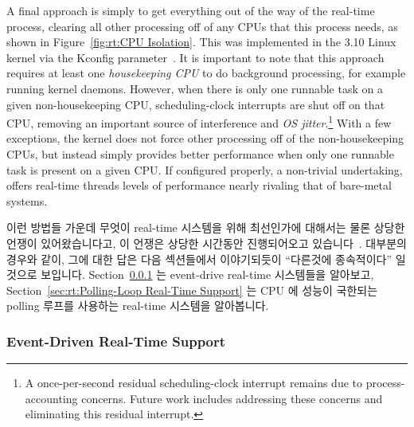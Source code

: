 A final approach is simply to get everything out of the way of the
real-time process, clearing all other processing off of any CPUs that
this process needs, as shown in Figure~\ref{fig:rt:CPU Isolation}.
This was implemented in the 3.10 Linux kernel via the 
Kconfig parameter~\cite{FredericWeisbecker2013nohz}.
It is important to note that this approach requires at least one
\emph{housekeeping CPU} to do background processing, for example running
kernel daemons.
However, when there is only one runnable task on a given non-housekeeping CPU,
scheduling-clock interrupts are shut off on that CPU, removing an important
source of interference and \emph{OS jitter}.\footnote{
	A once-per-second residual scheduling-clock interrupt remains
	due to process-accounting concerns.
	Future work includes addressing these concerns and eliminating
	this residual interrupt.}
With a few exceptions, the kernel does not force other processing off of the
non-housekeeping CPUs, but instead simply provides better performance
when only one runnable task is present on a given CPU.
If configured properly, a non-trivial undertaking, 
offers real-time threads levels of performance nearly rivaling that of
bare-metal systems.
\fi

이런 방법들 가운데 무엇이 real-time 시스템을 위해 최선인가에 대해서는 물론
상당한 언쟁이 있어왔습니다고, 이 언쟁은 상당한 시간동안 진행되어오고
있습니다~\cite{JonCorbet2004RealTimeLinuxPart1,JonCorbet2004RealTimeLinuxPart2}.
대부분의 경우와 같이, 그에 대한 답은 다음 섹션들에서 이야기되듯이 ``다른것에
종속적이다'' 일 것으로 보입니다.
Section~\ref{sec:rt:Event-Driven Real-Time Support} 는 event-drive real-time
시스템들을 알아보고,
Section~\ref{sec:rt:Polling-Loop Real-Time Support} 는 CPU 에 성능이 국한되는
polling 루프를 사용하는 real-time 시스템을 알아봅니다.

\subsubsection{Event-Driven Real-Time Support}
\label{sec:rt:Event-Driven Real-Time Support}

